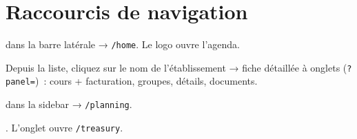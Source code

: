 \section{Raccourcis de navigation}

\begin{workflowstep}
   dans la barre latérale → \texttt{/home}. Le logo ouvre l'agenda.
\end{workflowstep}

\begin{workflowstep}
  Depuis la liste, cliquez sur le nom de l'établissement → fiche détaillée à onglets (\texttt{?panel=})~: cours + facturation, groupes, détails, documents.
\end{workflowstep}

\begin{workflowstep}
   dans la sidebar → \texttt{/planning}.
\end{workflowstep}

\begin{workflowstep}
  . L'onglet  ouvre \texttt{/treasury}.
\end{workflowstep}


